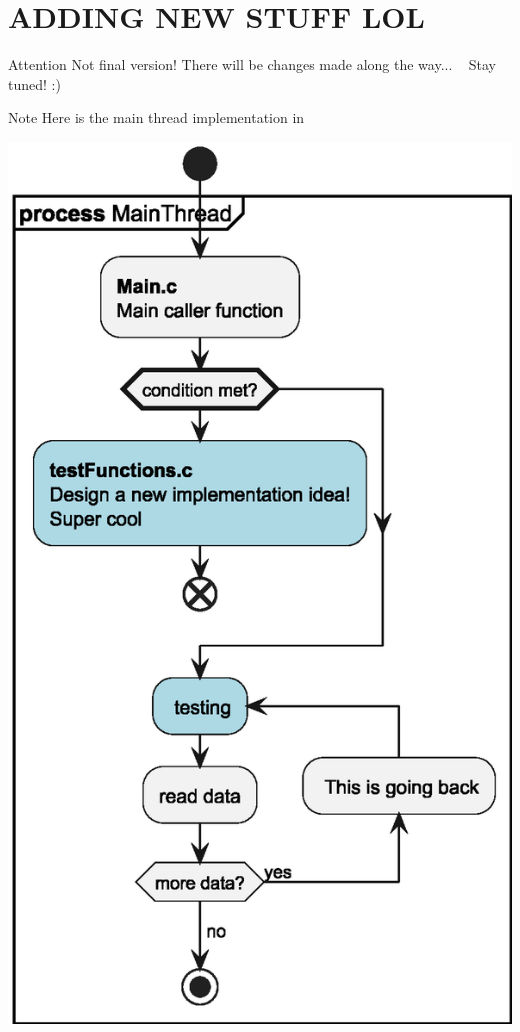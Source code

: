 \chapter{ADDING NEW STUFF LOL}
\hypertarget{page1}{}\label{page1}
\begin{DoxyAttention}{Attention}
Not final version! There will be changes made along the way... ~\newline
 Stay tuned! \+:)
\end{DoxyAttention}
\begin{DoxyNote}{Note}
Here is the main thread implementation in 
\end{DoxyNote}

\begin{DoxyImageNoCaption}
  \mbox{\includegraphics[width=\textwidth,height=\textheight/2,keepaspectratio=true]{inline_umlgraph_2}}
\end{DoxyImageNoCaption}
 